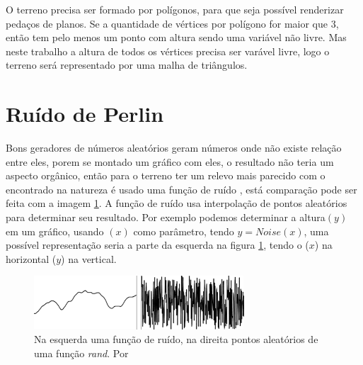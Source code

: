 O terreno precisa ser formado por polígonos, para que seja possível renderizar pedaços de planos.
Se a quantidade de vértices por polígono for maior que $3$, então tem pelo menos um ponto com altura sendo uma 
variável não livre. Mas neste trabalho a altura de todos os vértices precisa ser varável livre, logo o terreno será representado por uma malha de triângulos.
%

\section{Ruído de Perlin}
Bons geradores de números aleatórios geram números onde não existe relação entre
eles, porem se montado um gráfico com eles, o resultado não teria um aspecto
orgânico, então para o terreno ter um relevo mais parecido com o encontrado na 
natureza é usado uma função de ruído \cite{shiffman2012nature}, está comparação
pode ser feita com a imagem \ref{fig:randomAndNoise}. 
A função de ruído usa interpolação de pontos aleatórios para determinar seu resultado.
Por exemplo podemos determinar a altura$(y)$ em um gráfico, usando $(x)$ como 
parâmetro, tendo $y = Noise(x)$, uma possível representação seria a parte da esquerda na
figura \ref{fig:randomAndNoise}, tendo o ($x$) na horizontal ($y$) na vertical.
\begin{figure}[H]
    \centering
    \includegraphics[width=0.7\textwidth]{figuras/randomAndNoise.png}
    \caption{Na esquerda uma função de ruído, na direita pontos aleatórios de uma função \textit{rand}. Por \cite{shiffman2012nature}}
    \label{fig:randomAndNoise}
\end{figure}

